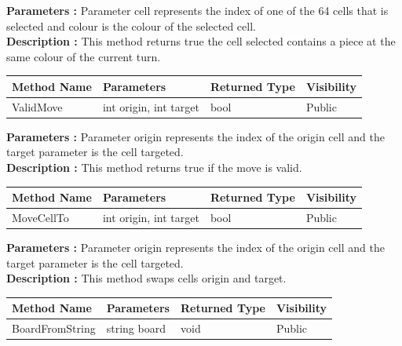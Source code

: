 \documentclass[12pt]{article}
\begin{document}
\textbf{Parameters :} Parameter cell represents the index of one of
the 64 cells that is selected and colour is the colour of the selected cell.
\\

\textbf{Description :} This method returns true the cell selected
contains a piece at the same colour of the current turn.

\begin{table}[H]
    \begin{tabular}{|l|l|l|l|}
    \hline
    \rowcolor[HTML]{EFEFEF} 
    \cellcolor[HTML]{EFEFEF}\textbf{Method Name} & \textbf{Parameters}     & \textbf{Returned Type} & \textbf{Visibility} \\ \hline
    ValidMove                                   & int origin, int target   & bool                   & Public              \\ \hline
    \end{tabular}
\end{table}

\textbf{Parameters :} Parameter origin represents the index of
the origin cell and the target parameter is the cell targeted.
\\

\textbf{Description :} This method returns true if the move is valid.

\begin{table}[H]
    \begin{tabular}{|l|l|l|l|}
    \hline
    \rowcolor[HTML]{EFEFEF} 
    \cellcolor[HTML]{EFEFEF}\textbf{Method Name} & \textbf{Parameters}     & \textbf{Returned Type} & \textbf{Visibility} \\ \hline
    MoveCellTo                                   & int origin, int target  & bool                   & Public              \\ \hline
    \end{tabular}
\end{table}

\textbf{Parameters :} Parameter origin represents the index of
the origin cell and the target parameter is the cell targeted.
\\

\textbf{Description :} This method swaps cells origin and target.

\begin{table}[H]
    \begin{tabular}{|l|l|l|l|}
    \hline
    \rowcolor[HTML]{EFEFEF} 
    \cellcolor[HTML]{EFEFEF}\textbf{Method Name} & \textbf{Parameters}     & \textbf{Returned Type} & \textbf{Visibility} \\ \hline
    BoardFromString                              & string board            & void                   & Public              \\ \hline
    \end{tabular}
\end{table}
\end{document}
